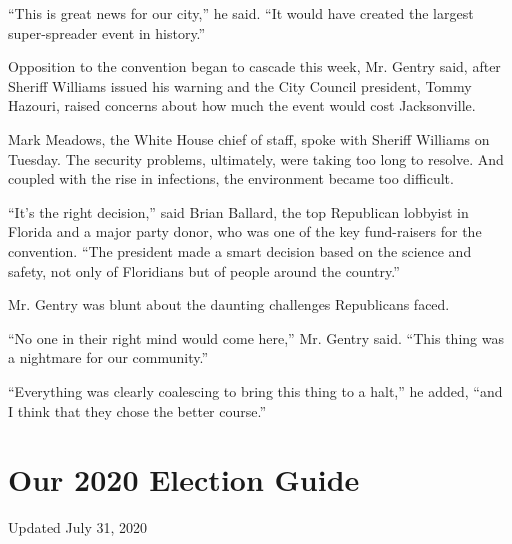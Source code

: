``This is great news for our city,'' he said. ``It would have created
the largest super-spreader event in history.''

Opposition to the convention began to cascade this week, Mr. Gentry
said, after Sheriff Williams issued his warning and the City Council
president, Tommy Hazouri, raised concerns about how much the event would
cost Jacksonville.

Mark Meadows, the White House chief of staff, spoke with Sheriff
Williams on Tuesday. The security problems, ultimately, were taking too
long to resolve. And coupled with the rise in infections, the
environment became too difficult.

``It's the right decision,'' said Brian Ballard, the top Republican
lobbyist in Florida and a major party donor, who was one of the key
fund-raisers for the convention. ``The president made a smart decision
based on the science and safety, not only of Floridians but of people
around the country.''

Mr. Gentry was blunt about the daunting challenges Republicans faced.

``No one in their right mind would come here,'' Mr. Gentry said. ``This
thing was a nightmare for our community.''

``Everything was clearly coalescing to bring this thing to a halt,'' he
added, ``and I think that they chose the better course.''

\hypertarget{our-2020-election-guide}{%
\section{Our 2020 Election Guide}\label{our-2020-election-guide}}

Updated July 31, 2020

